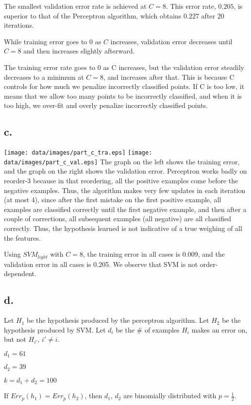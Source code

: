 \documentclass[]{article}
\begin{document}
The smallest validation error rate is achieved at $C = 8$. This error rate, $0.205$, is superior to that of the Perceptron algorithm, which obtains $0.227$ after 20 iterations.

While training error goes to 0 as $C$ increases, validation error decreases until $C=8$ and then increases slightly afterward.

The training error rate goes to 0 as C increases, but the validation error steadily decreases to a minimum at $C=8$, and increases after that. This is because C controls for how much we penalize incorrectly classified points. If C is too low, it means that we allow too many points to be incorrectly classified, and when it is too high, we over-fit and overly penalize incorrectly classified points.

\subsection{c.}
\texttt{[image: data/images/part\_c\_tra.eps]}
\texttt{[image: data/images/part\_c\_val.eps]}
The graph on the left shows the training error, and the graph on the right shows the validation error. Perceptron works badly on reorder-3 because in that reordering, all the positive examples come before the negative examples. Thus, the algorithm makes very few updates in each iteration (at most 4), since after the first mistake on the first positive example, all examples are classified correctly until the first negative example, and then after a couple of corrections, all subsequent examples (all negative) are all classified correctly. Thus, the hypothesis learned is not indicative of a true weighing of all the features.

Using $SVM_{light}$ with $C=8$, the training error in all cases is 0.009, and the validation error in all cases is 0.205. We observe that SVM is not order-dependent.

\subsection{d.}
Let $H_1$ be the hypothesis produced by the perceptron algorithm. Let $H_2$ be the hypothesis produced by SVM. Let $d_i$ be the \# of examples $H_i$ makes an error on, but not $H_{i'}$, $i' \neq i$.

$d_1 = 61$

$d_2 = 39$

$k = d_1 + d_2 = 100$

If $Err_p(h_1) = Err_p(h_2)$, then $d_1$, $d_2$ are binomially distributed with $p = \frac{1}{2}$.
\end{document}
